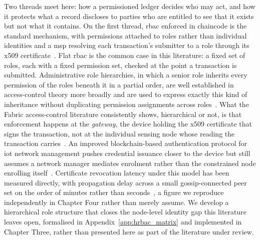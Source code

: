 \documentclass[12pt,a4paper,oneside]{book}
\begin{document}
\label{subsec:lit_privacy}

Two threads meet here: how a permissioned ledger decides who may act, and
how it protects what a record discloses to parties who are entitled to see
that it exists but not what it contains. On the first thread, \gls{rbac}
enforced in chaincode is the standard mechanism, with permissions attached
to roles rather than individual identities and a \gls{msp} resolving each
transaction's submitter to a role through its
\gls{x509} certificate~\cite{mdpiAccessControl, hyperledger2022msp}. Flat
\gls{rbac} is the common case in this literature: a fixed set of roles,
each with a fixed permission set, checked at the point a transaction is
submitted. Administrative role hierarchies, in which a senior role
inherits every permission of the roles beneath it in a partial order, are
well established in access-control theory more broadly and are used to
express exactly this kind of inheritance without duplicating permission
assignments across roles~\cite{lu2022revocation}. What the Fabric
access-control literature consistently shows, hierarchical or not, is that
enforcement happens at the \emph{gateway}, the device holding the
\gls{x509} certificate that signs the transaction, not at the individual
sensing node whose reading the transaction
carries~\cite{mdpiAccessControl, yavari2020blockchain}. An improved
blockchain-based authentication protocol for \gls{iot} network management
pushes credential issuance closer to the device but still assumes a
network manager mediates enrolment rather than the constrained node
enrolling itself~\cite{yavari2020blockchain}. Certificate revocation
latency under this model has been measured directly, with propagation
delay across a small gossip-connected peer set on the order of minutes
rather than seconds~\cite{lu2022revocation}, a figure we reproduce
independently in Chapter Four rather than merely assume. We develop a
hierarchical role structure that closes the node-level identity gap this
literature leaves open, formalised in Appendix~\ref{app:hrbac_matrix} and
implemented in Chapter Three, rather than presented here as part of the
literature under review.
\end{document}
